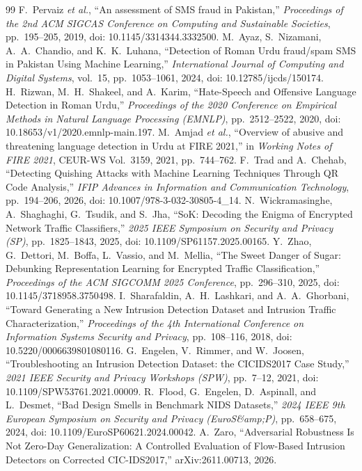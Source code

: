 \begin{thebibliography}{99}
 F.~Pervaiz \emph{et al.}, ``An assessment of SMS fraud in Pakistan,'' \emph{Proceedings of the 2nd ACM SIGCAS Conference on Computing and Sustainable Societies}, pp.~195--205, 2019, doi: 10.1145/3314344.3332500.
 M.~Ayaz, S.~Nizamani, A.~A.~Chandio, and K.~K.~Luhana, ``Detection of Roman Urdu fraud/spam SMS in Pakistan Using Machine Learning,'' \emph{International Journal of Computing and Digital Systems}, vol.~15, pp.~1053--1061, 2024, doi: 10.12785/ijcds/150174.
 H.~Rizwan, M.~H.~Shakeel, and A.~Karim, ``Hate-Speech and Offensive Language Detection in Roman Urdu,'' \emph{Proceedings of the 2020 Conference on Empirical Methods in Natural Language Processing (EMNLP)}, pp.~2512--2522, 2020, doi: 10.18653/v1/2020.emnlp-main.197.
 M.~Amjad \emph{et al.}, ``Overview of abusive and threatening language detection in Urdu at FIRE 2021,'' in \emph{Working Notes of FIRE 2021}, CEUR-WS Vol.~3159, 2021, pp.~744--762.
 F.~Trad and A.~Chehab, ``Detecting Quishing Attacks with Machine Learning Techniques Through QR Code Analysis,'' \emph{IFIP Advances in Information and Communication Technology}, pp.~194--206, 2026, doi: 10.1007/978-3-032-30805-4\_14.
 N.~Wickramasinghe, A.~Shaghaghi, G.~Tsudik, and S.~Jha, ``SoK: Decoding the Enigma of Encrypted Network Traffic Classifiers,'' \emph{2025 IEEE Symposium on Security and Privacy (SP)}, pp.~1825--1843, 2025, doi: 10.1109/SP61157.2025.00165.
 Y.~Zhao, G.~Dettori, M.~Boffa, L.~Vassio, and M.~Mellia, ``The Sweet Danger of Sugar: Debunking Representation Learning for Encrypted Traffic Classification,'' \emph{Proceedings of the ACM SIGCOMM 2025 Conference}, pp.~296--310, 2025, doi: 10.1145/3718958.3750498.
 I.~Sharafaldin, A.~H.~Lashkari, and A.~A.~Ghorbani, ``Toward Generating a New Intrusion Detection Dataset and Intrusion Traffic Characterization,'' \emph{Proceedings of the 4th International Conference on Information Systems Security and Privacy}, pp.~108--116, 2018, doi: 10.5220/0006639801080116.
 G.~Engelen, V.~Rimmer, and W.~Joosen, ``Troubleshooting an Intrusion Detection Dataset: the CICIDS2017 Case Study,'' \emph{2021 IEEE Security and Privacy Workshops (SPW)}, pp.~7--12, 2021, doi: 10.1109/SPW53761.2021.00009.
 R.~Flood, G.~Engelen, D.~Aspinall, and L.~Desmet, ``Bad Design Smells in Benchmark NIDS Datasets,'' \emph{2024 IEEE 9th European Symposium on Security and Privacy (EuroS\&amp;P)}, pp.~658--675, 2024, doi: 10.1109/EuroSP60621.2024.00042.
 A.~Zaro, ``Adversarial Robustness Is Not Zero-Day Generalization: A Controlled Evaluation of Flow-Based Intrusion Detectors on Corrected CIC-IDS2017,'' arXiv:2611.00713, 2026.

\end{thebibliography}
